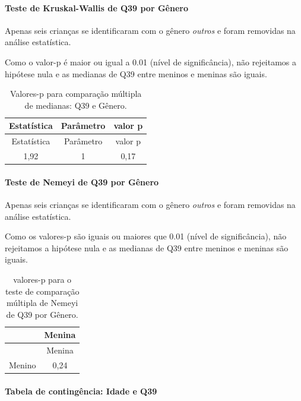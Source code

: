 \documentclass[]{article}
\let\oldparagraph\paragraph
\renewcommand{\paragraph}[1]{\oldparagraph{#1}\mbox{}}
\begin{document}
\hypertarget{teste-de-kruskal-wallis-de-q39-por-guxeanero}{%
\paragraph{Teste de Kruskal-Wallis de Q39 por Gênero}\label{teste-de-kruskal-wallis-de-q39-por-guxeanero}}

Apenas seis crianças se identificaram com o gênero \emph{outros} e foram removidas na análise estatística.

Como o valor-p é maior ou igual a 0.01 (nível de significância), não rejeitamos a hipótese nula e as medianas de Q39 entre meninos e meninas são iguais.

\begin{longtable}[]{@{}ccc@{}}
\caption{\label{tab:unnamed-chunk-1505}Valores-p para comparação múltipla de medianas: Q39 e Gênero.}\tabularnewline
\toprule
Estatística & Parâmetro & valor p\tabularnewline
\midrule
\endfirsthead
\toprule
Estatística & Parâmetro & valor p\tabularnewline
\midrule
\endhead
1,92 & 1 & 0,17\tabularnewline
\bottomrule
\end{longtable}

\hypertarget{teste-de-nemeyi-de-q39-por-guxeanero}{%
\paragraph{Teste de Nemeyi de Q39 por Gênero}\label{teste-de-nemeyi-de-q39-por-guxeanero}}

Apenas seis crianças se identificaram com o gênero \emph{outros} e foram removidas na análise estatística.

Como os valores-p são iguais ou maiores que 0.01 (nível de significância), não rejeitamos a hipótese nula e as medianas de Q39 entre meninos e meninas são iguais.

\begin{longtable}[]{@{}lc@{}}
\caption{\label{tab:unnamed-chunk-1507}valores-p para o teste de comparação múltipla de Nemeyi de Q39 por Gênero.}\tabularnewline
\toprule
& Menina\tabularnewline
\midrule
\endfirsthead
\toprule
& Menina\tabularnewline
\midrule
\endhead
Menino & 0,24\tabularnewline
\bottomrule
\end{longtable}

\cleardoublepage

\hypertarget{tabela-de-continguxeancia-idade-e-q39}{%
\paragraph{Tabela de contingência: Idade e Q39}\label{tabela-de-continguxeancia-idade-e-q39}}
\end{document}
